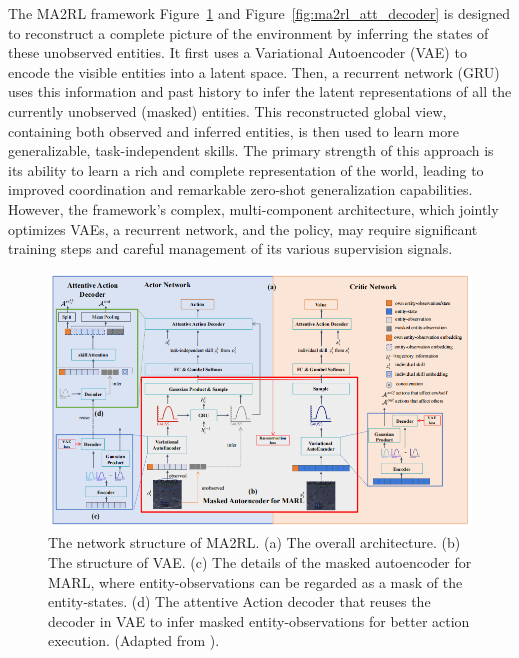 The MA2RL framework Figure~\ref{fig:ma2rl_architecture} and Figure~\ref{fig:ma2rl_att_decoder}  is designed to reconstruct a complete picture of the environment by inferring the states of these unobserved entities. It first uses a Variational Autoencoder (VAE)\parencite{vae} to encode the visible entities into a latent space. Then, a recurrent network (GRU) uses this information and past history to infer the latent representations of all the currently unobserved (masked) entities. This reconstructed global view, containing both observed and inferred entities, is then used to learn more generalizable, task-independent skills. The primary strength of this approach is its ability to learn a rich and complete representation of the world, leading to improved coordination and remarkable zero-shot generalization capabilities. However, the framework's complex, multi-component architecture, which jointly optimizes VAEs, a recurrent network, and the policy, may require significant training steps and careful management of its various supervision signals.

\begin{figure}[H] 
    \centering
        \includegraphics[width=\linewidth]{img_pfe/MA2RL.PNG}
   
    
        \caption{The network structure of MA2RL. (a) The overall architecture. (b) The structure of VAE. (c) The details of the masked autoencoder for MARL, where entity-observations can be regarded as a mask of the entity-states. (d) The attentive Action decoder that reuses the decoder in
VAE to infer masked entity-observations for better action execution. (Adapted from \parencite{ma2rl}).}
        \label{fig:ma2rl_architecture}
\end{figure}

